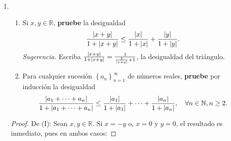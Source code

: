 \documentclass[12pt]{article}
\begin{document}
\begin{enumerate}
    \begin{proof}
        Procederemos por inducción sobre $n$. Para $n=1$ el resultado es claro, pues $x_1=7^1-1=6$ y $6|6$.
        Suponga el resultado cierto para $n=k$. Probaremos que se cumple para $n=k+1$, en efecto:
        \begin{equation*}
            \begin{split}
                7^{k+1}-1=&7^{k+1}-7^k+7^k-1\\
                =&7^k\cdot\left(7-1\right)+1\cdot\left(7^k-1\right)\\
                =&7^k\cdot6+1\cdot\left(7^k-1\right)
            \end{split}
        \end{equation*}
        Donde $6|6$ y $6|\left(7^k-1\right)$ (por hipótesis de inducción). Por tanto, $6$ debe dividir a cualquier combinación lineal de estos dos números. Así
        \begin{equation*}
                6|\left[7^k\cdot6+1\cdot\left(7^k-1\right)\right]\Rightarrow6|\left(7^{k+1}-1\right)
        \end{equation*}
        De esta forma, el resultado se cumple para $n=k+1$. Aplicando inducción, el resultado se cumple para toda $n\in\mathbb{N}$.
        \qed
    \end{proof}
    \item \begin{enumerate}
        \item Si $x,y\in\mathbb{R}$, \textbf{pruebe} la desigualdad
        \begin{equation*}
            \frac{\left| x+y \right|}{1+\left| x+y \right|}\leq\frac{\left| x \right|}{1+\left| x \right|}+\frac{\left| y \right|}{1+\left| y \right|}.
        \end{equation*}
        \textit{Sugerencia.} Escriba $\frac{\left| x+y \right|}{1+\left| x+y \right|}=\frac{1}{\frac{1}{\left| x+y \right|}+1}$, la desigualdad del triángulo.
        \item Para cualquier sucesión $\left\{a_n\right\}^\infty_{n=1}$ de números reales, \textbf{pruebe} por inducción la desigualdad
        \begin{equation*}
            \frac{\left| a_1+\cdots+a_n \right|}{1+\left| a_1+\cdots+a_n \right|}\leq\frac{\left| a_1 \right|}{1+\left| a_1 \right|}+\cdots+\frac{\left| a_n \right|}{1+\left| a_n \right|}, \quad \forall n\in\mathbb{N}, n\geq2.
        \end{equation*}
    \end{enumerate}
    \begin{proof}
        De (I): Sean $x,y\in\mathbb{R}$. Si $x=-y$ o, $x = 0$ y $y = 0$, el resultado es inmediato, pues en ambos casos:

\end{proof}
\end{enumerate}
\end{document}
